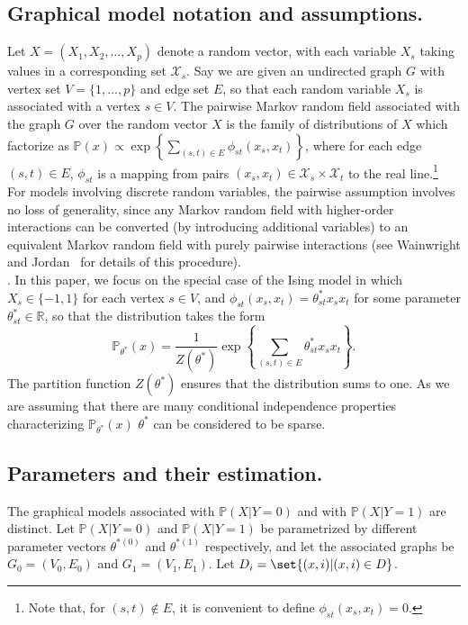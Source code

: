 \documentclass{article}
\newcommand\myparagraph[1]{\noindent {\it #1}.}
\def\real{\mathbb{R}}
\def\statesp{\mathcal{X}}
\def\vertex{V}
\def\edge{\ensuremath{E}}
\def\graph{G}
\def\mprob{\mathbb{P}}
\begin{document}
\subsection{Graphical model notation and assumptions.}
Let $X = (X_1, X_2, \ldots, X_p)$ denote 
a random vector, with each variable $X_s$ taking values in a corresponding set $\statesp_s$. Say we are given an
undirected graph $\graph$ with vertex set $\vertex = \{1,\ldots, p \}$ and edge set $\edge$, so that each random variable $X_s$ is associated with a vertex $s \in
\vertex$. The pairwise Markov random field associated with the graph $\graph$ over the random vector $X$ is the family of distributions of $X$ which factorize as $\mprob(x) \propto \exp \left \{
\sum_{(s,t) \in \edge} \phi_{st}(x_s, x_t) \right\}$, where for each edge $(s,t) \in \edge$, $\phi_{st}$ is a mapping from pairs $(x_s, x_t) \in \statesp_s \times
\statesp_t$ to the real line.\footnote{Note that, for $(s, t) \notin \edge$, it is convenient to define $\phi_{st}(x_s, x_t) = 0$.}  For models involving discrete random variables, the pairwise assumption involves no loss of generality,
since any Markov random field with higher-order interactions can be converted (by introducing additional variables) to an equivalent
Markov random field with purely pairwise interactions (see Wainwright
and Jordan~\cite{WaiJor03Monster} for details of this procedure).\\

\myparagraph{Ising Model} In this paper, we focus on the special case of the Ising model in which $X_s \in \{-1,1\}$ for each vertex $s \in
\vertex$, and $\phi_{st}(x_s, x_t) = \theta^*_{st} x_s x_t$ for some parameter $\theta^*_{st} \in \real$, so that the distribution takes
the form
\begin{equation}
\label{EqnIsing}
\mprob_{\theta^*}(x) = \frac{1}{Z(\theta^*)} \exp \left \{\sum_{(s,t)\in \edge} \theta^*_{st} x_s x_t \right \}.
\end{equation}
The partition function $Z(\theta^*)$ ensures that the distribution
sums to one. As we are assuming that there are many conditional independence properties characterizing $\mprob_{\theta^*}(x)$ $\theta^*$ can be considered to be sparse.

\subsection{Parameters and their estimation.}
The graphical models associated with $\mprob(X|Y=0)$ and with $\mprob(X|Y=1)$ are distinct. Let $\mprob(X|Y=0)$ and $\mprob(X|Y=1)$ be parametrized by different parameter vectors $\theta^{*(0)}$ and $\theta^{*(1)}$ respectively, and let the associated graphs be $\graph_0 = (\vertex_0, \edge_0)$ and $\graph_1 = (\vertex_1, \edge_1)$. Let $D_i=\set{(x, i)| (x, i) \in D}$.
\end{document}
